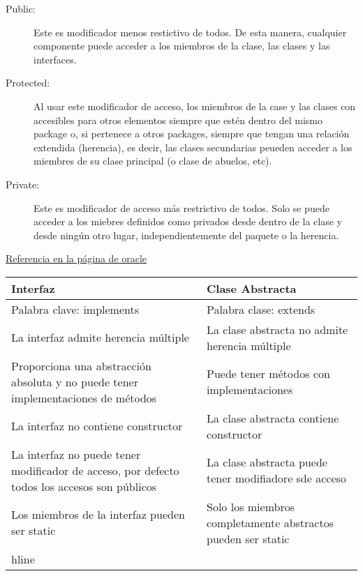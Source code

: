 \begin{description}
    \item[Public: ] Este es modificador menos restictivo de todos. De esta manera, cualquier componente puede acceder a los miembros de la clase, las clases y las interfaces.
    \item[Protected: ] Al usar este modificador de acceso, los miembros de la case y las clases con accesibles para otros elementos siempre que est\'en dentro del mismo package o, si pertenece a otros packages, siempre que tengan una relaci\'on extendida (herencia), es decir, las clases secundarias peueden acceder a los miembres de su clase principal (o clase de abuelos, etc).
    \item[Private: ] Este es modificador de acceso m\'as restrictivo de todos. Solo se puede acceder a los miebres definidos como privados desde dentro de la clase y desde ning\'un otro lugar, independientemente del paquete o la herencia. 
\end{description}


\href{https://docs.oracle.com/javase/tutorial/java/javaOO/accesscontrol.html}{Referencia en la p\'agina de oracle}

\begin{center}
    \begin{tabular}[t]{l l}
      Interfaz                    &     Clase Abstracta\\ \hline
      Palabra clave: implements   &   	Palabra clase:  extends\\  
      La interfaz admite herencia m\'ultiple 	  &   La clase abstracta no admite herencia m\'ultiple\\  
      Proporciona una abstracci\'on absoluta y no puede tener implementaciones de m\'etodos 	  &  Puede tener m\'etodos con implementaciones        \\   
      La interfaz no contiene constructor 	  & La clase abstracta contiene constructor 	                \\ \hline
      La interfaz no puede tener modificador de acceso, por defecto todos los accesos son p\'ublicos & La clase abstracta puede tener modifiadore sde acceso\\ \hline
      Los miembros de la interfaz pueden ser static   & Solo los miembros completamente abstractos pueden ser static \\hline
    \end{tabular}
  \end{center}